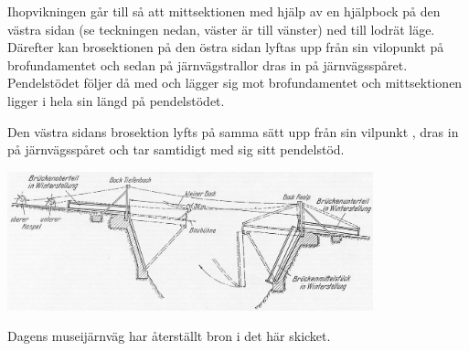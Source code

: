\documentclass[notitlepage,10pt,swedish,a4paper]{article}
\begin{document}
Ihopvikningen går till så att mittsektionen med hjälp av en hjälpbock på den västra sidan (se teckningen nedan, väster är till vänster) ned till lodrät läge. Därefter kan brosektionen på den östra sidan lyftas upp från sin vilopunkt på brofundamentet och sedan på järnvägstrallor dras in på järnvägsspåret. Pendelstödet följer då med och lägger sig mot brofundamentet och mittsektionen ligger i hela sin längd på pendelstödet.

Den västra sidans brosektion lyfts på samma sätt upp från sin vilpunkt , dras in på järnvägsspåret och tar samtidigt med sig sitt pendelstöd.

\includegraphics[width=300pt]{abb13_300}

Dagens museijärnväg har återställt bron i det här skicket.
\end{document}
